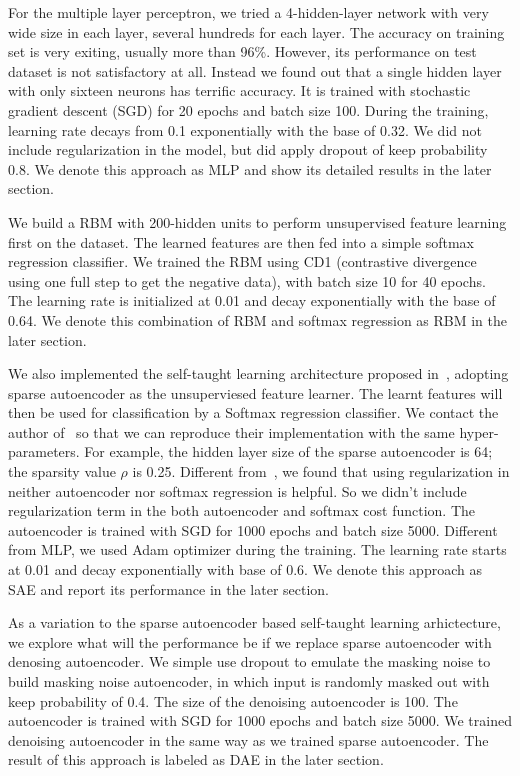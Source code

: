 For the multiple layer perceptron, we tried a 4-hidden-layer network with
very wide size in each layer, several hundreds for each layer.
The accuracy on training set is very exiting, usually more than 96\%.
However, its performance on test dataset is not satisfactory at all.
Instead we found out that a single hidden layer with only sixteen neurons has terrific accuracy.
It is trained with stochastic gradient descent (SGD) for 20 epochs and batch size 100.
During the training, learning rate decays from 0.1 exponentially with the base of 0.32.
We did not include regularization in the model, but did apply dropout of keep probability 0.8.
We denote this approach as MLP and show its detailed results in the later section.

We build a RBM with 200-hidden units to perform unsupervised feature learning first on the dataset.
The learned features are then fed into a simple softmax regression classifier.
We trained the RBM using CD1 (contrastive divergence using one full step to get the negative data),
with batch size 10 for 40 epochs.
The learning rate is initialized at 0.01 and decay exponentially with the base of 0.64.
We denote this combination of RBM and softmax regression as RBM in the later section.

We also implemented the self-taught learning architecture proposed in~\cite{STL-NIDS, SparseAE},
adopting sparse autoencoder as the unsuperviesed feature learner.
The learnt features will then be used for classification by a Softmax regression classifier.
We contact the author of~\cite{STL-NIDS} so that we can reproduce their implementation
with the same hyper-parameters.
For example, the hidden layer size of the sparse autoencoder is 64;
the sparsity value $\rho$ is 0.25.
Different from~\cite{STL-NIDS}, we found that using regularization in
neither autoencoder nor softmax regression is helpful.
So we didn't include regularization term in the both autoencoder and softmax cost function.
The autoencoder is trained with SGD for 1000 epochs and batch size 5000.
Different from MLP, we used Adam optimizer during the training.
The learning rate starts at 0.01 and decay exponentially with base of 0.6.
We denote this approach as SAE and report its performance in the later section.

As a variation to the sparse autoencoder based self-taught learning arhictecture,
we explore what will the performance be if we replace sparse autoencoder with denosing autoencoder.
We simple use dropout to emulate the masking noise to build masking noise autoencoder,
in which input is randomly masked out with keep probability of 0.4.
The size of the denoising autoencoder is 100.
The autoencoder is trained with SGD for 1000 epochs and batch size 5000.
We trained denoising autoencoder in the same way as we trained sparse autoencoder.
The result of this approach is labeled as DAE in the later section.

